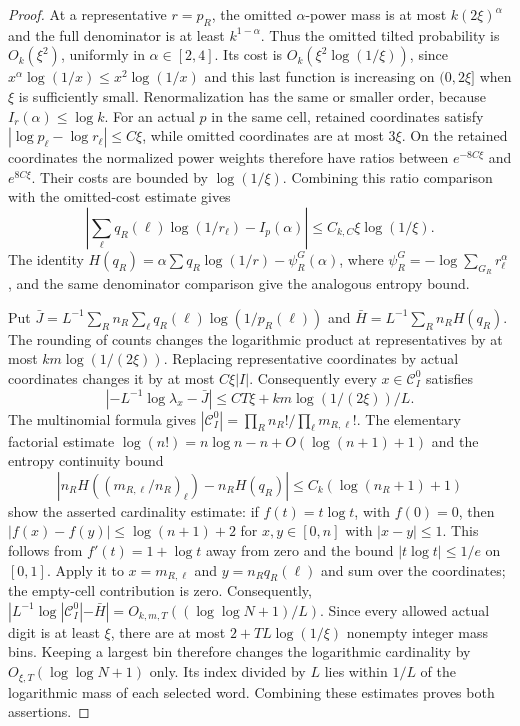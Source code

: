 \documentclass[11pt]{article}
\numberwithin{equation}{section}
\newcommand{\1}{\mathbf 1}
\begin{document}
\begin{proof}
At a representative $r=p_R$, the omitted $\alpha$-power mass is at most
$k(2\xi)^\alpha$ and the full denominator is at least $k^{1-\alpha}$.
Thus the omitted tilted probability is $O_k(\xi^2)$, uniformly in
$\alpha\in[2,4]$.  Its cost is
$O_k(\xi^2\log(1/\xi))$, since
$x^\alpha\log(1/x)\le x^2\log(1/x)$ and this last function is increasing
on $(0,2\xi]$ when $\xi$ is sufficiently small.
Renormalization has the same or smaller order, because
$I_r(\alpha)\le\log k$.
For an actual $p$ in the same cell, retained coordinates satisfy
$|\log p_\ell-\log r_\ell|\le C\xi$, while omitted coordinates are at
most $3\xi$.  On the retained coordinates the normalized power weights
therefore have ratios between $e^{-8C\xi}$ and $e^{8C\xi}$.
Their costs are bounded by $\log(1/\xi)$.
Combining this ratio comparison with the omitted-cost estimate gives
\[
 \left|\sum_\ell q_R(\ell)\log(1/r_\ell)-I_p(\alpha)\right|
 \le C_{k,C}\xi\log(1/\xi).
\]
The identity $H(q_R)=\alpha\sum q_R\log(1/r)-\psi_R^G(\alpha)$,
where $\psi_R^G=-\log\sum_{G_R}r_\ell^\alpha$, and the same denominator
comparison give the analogous entropy bound.

Put $\bar J=L^{-1}\sum_R n_R\sum_\ell q_R(\ell)\log(1/p_R(\ell))$
and $\bar H=L^{-1}\sum_R n_RH(q_R)$.
The rounding of counts changes the logarithmic product at representatives
by at most $km\log(1/(2\xi))$.
Replacing representative coordinates by actual coordinates changes it by
at most $C\xi|I|$.  Consequently every $x\in\mathcal C^0_I$ satisfies
\[
 |{-L^{-1}\log\lambda_x}-\bar J|
 \le CT\xi+km\log(1/(2\xi))/L.
\]
The multinomial formula gives
$|\mathcal C^0_I|=\prod_Rn_R!/\prod_\ell m_{R,\ell}!$.
The elementary factorial estimate
$\log(n!)=n\log n-n+O(\log(n+1)+1)$ and the entropy continuity bound
\[
 |n_RH((m_{R,\ell}/n_R)_\ell)-n_RH(q_R)|
 \le C_k(\log(n_R+1)+1)
\]
show the asserted cardinality estimate: if $f(t)=t\log t$, with $f(0)=0$,
then $|f(x)-f(y)|\le\log(n+1)+2$ for $x,y\in[0,n]$ with
$|x-y|\le1$. This follows from $f'(t)=1+\log t$ away from zero and
the bound $|t\log t|\le1/e$ on $[0,1]$. Apply it to
$x=m_{R,\ell}$ and $y=n_Rq_R(\ell)$ and sum over the coordinates;
the empty-cell contribution is zero. Consequently,
$|L^{-1}\log|\mathcal C^0_I|-\bar H|
 =O_{k,m,T}((\log\log N+1)/L)$.
Since every allowed actual digit is at least $\xi$, there are at most
$2+TL\log(1/\xi)$ nonempty integer mass bins.
Keeping a largest bin therefore changes the logarithmic cardinality by
$O_{\xi,T}(\log\log N+1)$ only.  Its index divided by $L$ lies within
$1/L$ of the logarithmic mass of each selected word.
Combining these estimates proves both assertions.
\end{proof}
\end{document}
